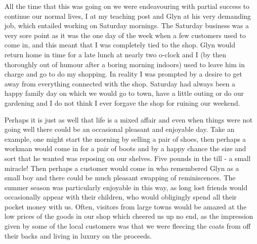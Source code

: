 All the time that this was going on we were endeavouring with partial success to continue our normal lives, I at my teaching post and Glyn at his very demanding job, which entailed working on Saturday mornings. The Saturday business was a very sore point as it was the one day of the week when a few customers used to come in, and this meant that I was completely tied to the shop. Glyn would return home in time for a late lunch at nearly two o-clock and I (by then thoroughly out of humour after a boring morning indoors) used to leave him in charge and go to do my shopping. In reality I was prompted by a desire to get away from everything connected with the shop. Saturday had always been a happy family day on which we would go to town, have a little outing or do our gardening and I do not think I ever forgave the shop for ruining our weekend.

Perhaps it is just as well that life is a mixed affair and even when things were not going well there could be an occasional pleasant and enjoyable day. Take an example, one might start the morning by selling a pair of shoes, then perhaps a workman would come in for a pair of boots and by a happy chance the size and sort that he wanted was reposing on our shelves. Five pounds in the till - a small miracle! Then perhaps a customer would come in who remembered Glyn as a small boy and there could be much pleasant swapping of reminiscences. The summer season was particularly enjoyable in this way, as long lost friends would occasionally appear with their children, who would obligingly spend all their pocket money with us. Often, visitors from large towns would be amazed at the low prices of the goods in our shop which cheered us up no end, as the impression given by some of the local customers was that we were fleecing the coats from off their backs and living in luxury on the proceeds.

